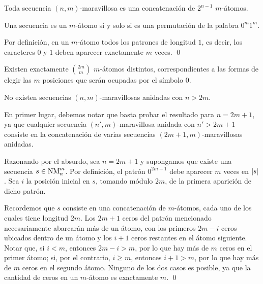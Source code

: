 \begin{obs}
  Toda secuencia $(n,m)$-maravillosa es una concatenación de $2^{n-1}$
  $m$-átomos.
\end{obs}

\begin{lema}
  Una secuencia es un $m$-átomo si y solo si es una permutación de la palabra
  $0^m1^m$.
\end{lema}

\begin{demo}
  Por definición, en un $m$-átomo todos los patrones de longitud $1$, es
  decir, los caracteres $0$ y $1$ deben aparecer exactamente $m$ veces. \qed
\end{demo}

\begin{coro}
  Existen exactamente $\binom{2m}{m}$ $m$-átomos distintos, correspondientes a
  las formas de elegir las $m$ posiciones que serán ocupadas por el símbolo
  $0$.
\end{coro}

\begin{prop}
  No existen secuencias $(n,m)$-maravillosas anidadas con $n > 2m$.
\end{prop}

\begin{demo}
  En primer lugar, debemos notar que basta probar el resultado para $n = 2m +
    1$, ya que cualquier secuencia $(n',m)$-maravillosa anidada con $n' > 2m +
    1$ consiste en la concatenación de varias secuencias
  $(2m+1,m)$-maravillosas anidadas.

  Razonando por el absurdo, sea $n = 2m + 1$ y supongamos que existe una
  secuencia $s \in \text{NM}_{n}^{m}$. Por definición, el patrón $0^{2m+1}$ debe
  aparecer $m$ veces en $\left\vert s\right\vert$. Sea $i$ la posición inicial en $s$, tomando
  módulo $2m$, de la primera aparición de dicho patrón.

  Recordemos que $s$ consiste en una concatenación de $m$-átomos, cada uno de
  los cuales tiene longitud $2m$. Los $2m+1$ ceros del patrón mencionado
  necesariamente abarcarán más de un átomo, con los primeros $2m - i$ ceros
  ubicados dentro de un átomo y los $i + 1$ ceros restantes en el átomo
  siguiente. Notar que, si $i < m$, entonces $2m - i > m$, por lo que hay más
  de $m$ ceros en el primer átomo; si, por el contrario, $i \geq m$, entonces
  $i + 1 > m$, por lo que hay más de $m$ ceros en el segundo átomo. Ninguno
  de los dos casos es posible, ya que la cantidad de ceros en un $m$-átomo es
  exactamente $m$. \qed
\end{demo}

